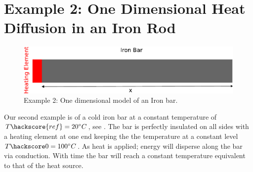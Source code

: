 
%
%
%


\section{Example 2: One Dimensional Heat Diffusion in an Iron Rod}

\label{Sec:1DHDv0}
\begin{figure}[ht]
\centerline{\includegraphics[width=4.in]{figures/onedheatdiff002}}
\caption{Example 2: One dimensional model of an Iron bar.}
\label{fig:onedhdmodel}
\end{figure}

Our second example is of a cold iron bar at a constant temperature of $T\hackscore{ref}=20^{\circ} C$, see . The bar is perfectly insulated on all sides with a heating element at one end keeping the the temperature at a constant level $T\hackscore0=100^{\circ} C$.  As heat is applied; energy will disperse along the bar via conduction. With time the bar will reach a constant temperature equivalent to that of the heat source.

